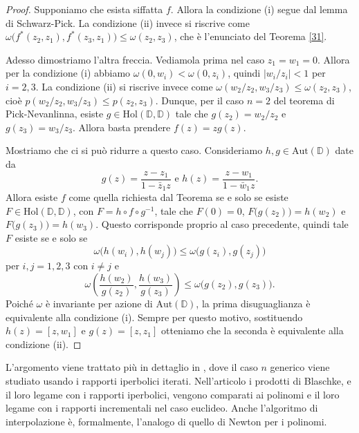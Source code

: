 \begin{proof}
  Supponiamo che esista siffatta $f$. Allora la condizione (i) segue dal lemma di Schwarz-Pick. La condizione (ii) invece si riscrive come $\omega\bigl(f^*(z_2,z_1),f^*(z_3,z_1)\bigr) \le \omega(z_2,z_3)$, che è l'enunciato del Teorema \ref{31}.

  Adesso dimostriamo l'altra freccia. Vediamola prima nel caso $z_1=w_1=0$. Allora per la condizione (i) abbiamo $\omega(0,w_i) < \omega(0,z_i)$, quindi $|w_i/z_i|<1$ per $i=2,3$. La condizione (ii) si riscrive invece come $\omega(w_2/z_2,w_3/z_3) \le \omega(z_2,z_3)$, cioè $p(w_2/z_2,w_3/z_3) \le p(z_2,z_3)$.
  Dunque, per il caso $n=2$ del teorema di Pick-Nevanlinna, esiste $g \in \text{Hol}(\mathbb{D},\mathbb{D})$ tale che $g(z_2)=w_2/z_2$ e $g(z_3)=w_3/z_3$. Allora basta prendere $f(z)=zg(z)$.

   Mostriamo che ci si può ridurre a questo caso. Consideriamo $h, g \in \text{Aut}(\mathbb{D})$ date da
   $$g(z)=\frac{z-z_1}{1-\bar{z}_1z} \,\, \text{e} \,\, h(z)=\frac{z-w_1}{1-\bar{w}_1z}.$$
   Allora esiste $f$ come quella richiesta dal Teorema se e solo se esiste $F \in \text{Hol}(\mathbb{D},\mathbb{D})$, con $F=h \circ f \circ g^{-1}$, tale che $F(0)=0$, $F\bigl(g(z_2)\bigr)=h(w_2)$ e $F\bigl(g(z_3)\bigr)=h(w_3)$.
   Questo corrisponde proprio al caso precedente, quindi tale $F$ esiste se e solo se
   $$\omega\bigl(h(w_i),h(w_j)\bigr) \le \omega\bigl(g(z_i),g(z_j)\bigr)$$
   per $i,j=1,2,3$ con $i\not=j$ e
   $$\omega\left(\frac{h(w_2)}{g(z_2)},\frac{h(w_3)}{g(z_3)}\right) \le \omega\bigl(g(z_2),g(z_3)\bigr).$$
   Poiché $\omega$ è invariante per azione di $\text{Aut}(\mathbb{D})$, la prima disuguaglianza è equivalente alla condizione (i). Sempre per questo motivo, sostituendo $h(z)=[z,w_1]$ e $g(z)=[z,z_1]$ otteniamo che la seconda è equivalente alla condizione (ii).
\end{proof}

L'argomento viene trattato più in dettaglio in \cite{BRW}, dove il caso $n$ generico viene studiato usando i rapporti iperbolici iterati. Nell'articolo i prodotti di Blaschke, e il loro legame con i rapporti iperbolici, vengono comparati ai polinomi e il loro legame con i rapporti incrementali nel caso euclideo. Anche l'algoritmo di interpolazione è, formalmente, l'analogo di quello di Newton per i polinomi.
